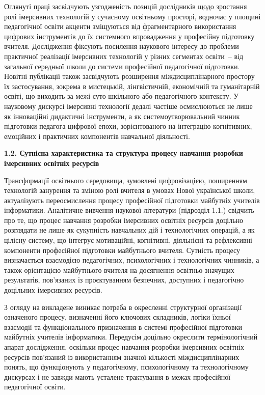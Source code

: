 Оглянуті праці засвідчують узгодженість позицій дослідників щодо зростання ролі імерсивних технологій у сучасному освітньому просторі, водночас у площині педагогічної освіти акценти зміщуються від фрагментарного використання цифрових інструментів до їх системного впровадження у професійну підготовку вчителя. Дослідження фіксують посилення наукового інтересу до проблеми практичної реалізації імерсивних технологій у різних сегментах освіти~-- від загальної середньої школи до системи професійної педагогічної підготовки. Новітні публікації також засвідчують розширення міждисциплінарного простору їх застосування, зокрема в мистецькій, лінгвістичній, економічній та гуманітарній освіті, що виходить за межі суто шкільного або педагогічного контексту. У науковому дискурсі імерсивні технології дедалі частіше осмислюються не лише як інноваційні дидактичні інструменти, а як системоутворювальний чинник підготовки педагога цифрової епохи, зорієнтованого на інтеграцію когнітивних, емоційних і практичних компонентів навчальної діяльності.

\textbf{1.2. Сутнісна характеристика та структура процесу навчання розробки імерсивних освітніх ресурсів}

Трансформації освітнього середовища, зумовлені цифровізацією, поширенням технологій занурення та зміною ролі вчителя в умовах Нової української школи, актуалізують переосмислення процесу професійної підготовки майбутніх учителів інформатики. Аналітичне вивчення наукової літератури (підрозділ 1.1.) свідчить про те, що процес навчання розробки імерсивних освітніх ресурсів доцільно розглядати не лише як сукупність навчальних дій і технологічних операцій, а як цілісну систему, що інтегрує мотиваційні, когнітивні, діяльнісні та рефлексивні компоненти професійної підготовки майбутнього вчителя. Сутність процесу визначається взаємодією педагогічних, психологічних і технологічних чинників, а також орієнтацією майбутнього вчителя на досягнення освітньо значущих результатів, пов'язаних із проєктуванням безпечних, доступних і педагогічно доцільних імерсивних ресурсів.

З огляду на викладене виникає потреба в окресленні структурної організації означеного процесу, визначенні його ключових складників, логіки їхньої взаємодії та функціонального призначення в системі професійної підготовки майбутніх учителів інформатики. Передусім доцільно окреслити термінологічний апарат дослідження, оскільки процес навчання розробки імерсивних освітніх ресурсів пов'язаний із використанням значної кількості міждисциплінарних понять, що функціонують у педагогічному, психологічному та технологічному дискурсах і не завжди мають усталене трактування в межах професійної педагогічної освіти.

